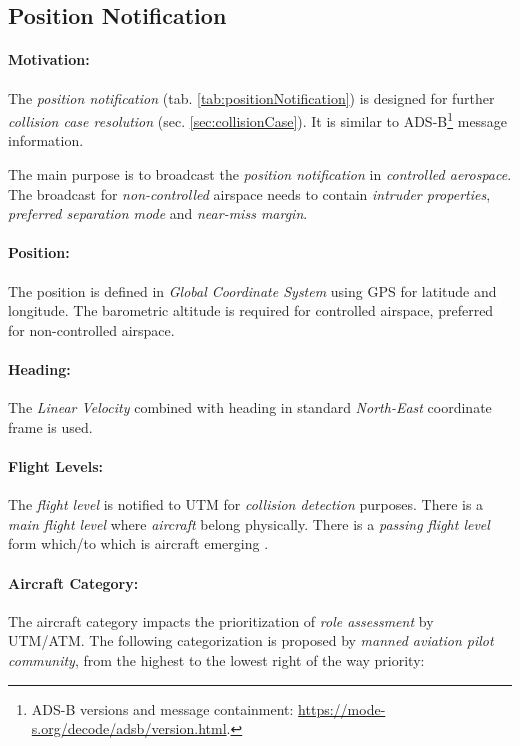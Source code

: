 \subsection{Position Notification}\label{sec:positionNotification}

\paragraph{Motivation:} The \emph{position notification} (tab. \ref{tab:positionNotification}) is designed for further \emph{collision case resolution} (sec. \ref{sec:collisionCase}). It is similar to ADS-B\footnote{ADS-B versions and message containment: \url{https://mode-s.org/decode/adsb/version.html}.} message information. 


The main purpose is to broadcast the \emph{position notification} in \emph{controlled aerospace}. The broadcast for \emph{non-controlled} airspace needs to contain \emph{intruder properties}, \emph{preferred separation mode} and \emph{near-miss margin}.

\paragraph{Position:} The position is defined in \emph{Global Coordinate System} using GPS for latitude and longitude. The barometric altitude is required for controlled airspace, preferred for non-controlled airspace.

\paragraph{Heading:} The \emph{Linear Velocity} combined with heading in standard \emph{North-East} coordinate frame is used.

\paragraph{Flight Levels:} The \emph{flight level} is notified to UTM for \emph{collision detection} purposes. There is a \emph{main flight level} where \emph{aircraft} belong physically. There is a \emph{passing flight level} form which/to which is aircraft emerging \cite{icao4444}. 

\paragraph{Aircraft Category:} The aircraft category impacts the prioritization of \emph{role assessment} by UTM/ATM. The following categorization is proposed by \emph{manned aviation pilot community}, from the highest to the lowest right of the way priority:

